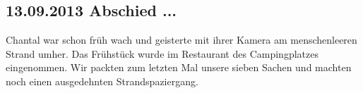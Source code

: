\subsection{13.09.2013 Abschied ...} 
Chantal war schon früh wach und geisterte mit ihrer Kamera am menschenleeren Strand umher. 
Das Frühstück wurde im Restaurant des Campingplatzes eingenommen.
Wir packten zum letzten Mal unsere sieben Sachen und machten noch einen ausgedehnten Strandspaziergang.
